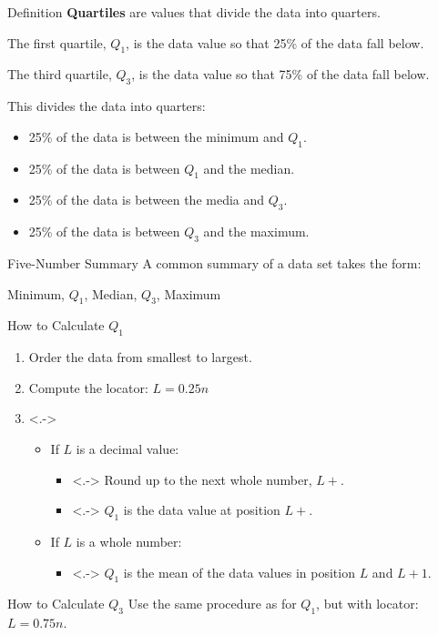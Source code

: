 \documentclass{beamer}
\begin{document}
\begin{frame}
\begin{block}{Definition}
\textbf{Quartiles} are values that divide the data into quarters.\pause

\vspace{2mm}
The first quartile, $Q_1$, is the data value so that 25\% of the data fall below. 

\vspace{2mm}
The third quartile, $Q_3$, is the data value so that 75\% of the data fall below.\pause

\vspace{2mm}
This divides the data into quarters:
\begin{itemize}
\item 25\% of the data is between the minimum and $Q_1$.
\item 25\% of the data is between $Q_1$ and the median.
\item 25\% of the data is between the media and $Q_3$.
\item 25\% of the data is between $Q_3$ and the maximum.
\end{itemize}
\end{block}\pause

\begin{block}{Five-Number Summary}
A common summary of a data set takes the form:

Minimum, $Q_1$, Median, $Q_3$, Maximum
\end{block}
\end{frame}

\begin{frame}
\begin{block}{How to Calculate $Q_1$}
\begin{enumerate}[<+->]
\item Order the data from smallest to largest.
\item Compute the locator: $L=0.25n$
\item<.->
\begin{itemize}
\item<+-> If $L$ is a decimal value:
\begin{itemize}
\item<.-> Round up to the next whole number, $L+$.
\item<.-> $Q_1$ is the data value at position $L+$.
\end{itemize}
\item<+-> If $L$ is a whole number:
\begin{itemize}
\item<.-> $Q_1$ is the mean of the data values in position $L$ and $L+1$.
\end{itemize}
\end{itemize}
\end{enumerate}
\end{block}

\onslide<+->
\begin{block}{How to Calculate $Q_3$}
Use the same procedure as for $Q_1$, but with locator: $L=0.75n$.
\end{block}
\end{frame}
\end{document}
